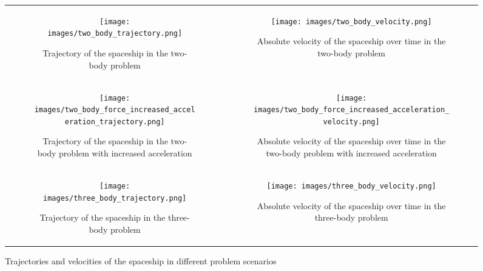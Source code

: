 \documentclass[12pt,a4paper]{article}
\begin{document}
\begin{figure}[H]
    \centering
    \begin{tabular}{cc}
        \begin{subfigure}[b]{0.45\textwidth}
            \centering
            \texttt{[image: images/two\_body\_trajectory.png]}
            \caption{Trajectory of the spaceship in the two-body problem}
            \label{fig:two_body_trajectory}
        \end{subfigure} &
        \begin{subfigure}[b]{0.45\textwidth}
            \centering
            \texttt{[image: images/two\_body\_velocity.png]}
            \caption{Absolute velocity of the spaceship over time in the two-body problem}
            \label{fig:two_body_velocity}
        \end{subfigure} \\
        \begin{subfigure}[b]{0.45\textwidth}
            \centering
            \texttt{[image: images/two\_body\_force\_increased\_acceleration\_trajectory.png]}
            \caption{Trajectory of the spaceship in the two-body problem with increased acceleration}
            \label{fig:two_body_acceleration_trajectory}
        \end{subfigure} &
        \begin{subfigure}[b]{0.45\textwidth}
            \centering
            \texttt{[image: images/two\_body\_force\_increased\_acceleration\_velocity.png]}
            \caption{Absolute velocity of the spaceship over time in the two-body problem with increased acceleration}
            \label{fig:two_body_acceleration_velocity}
        \end{subfigure} \\
        \begin{subfigure}[b]{0.45\textwidth}
            \centering
            \texttt{[image: images/three\_body\_trajectory.png]}
            \caption{Trajectory of the spaceship in the three-body problem}
            \label{fig:three_body_trajectory}
        \end{subfigure} &
        \begin{subfigure}[b]{0.45\textwidth}
            \centering
            \texttt{[image: images/three\_body\_velocity.png]}
            \caption{Absolute velocity of the spaceship over time in the three-body problem}
            \label{fig:three_body_velocity}
        \end{subfigure}
    \end{tabular}
    \caption{Trajectories and velocities of the spaceship in different problem scenarios}
    \label{fig:data_generation_simulation}
\end{figure}
\end{document}
